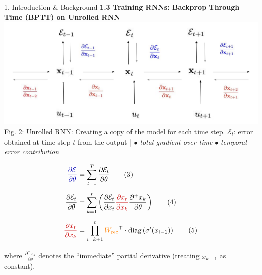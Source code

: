 \documentclass[final]{beamer}
\begin{document}
\begin{frame}[t]
\begin{columns}[t,totalwidth=\textwidth]
\begin{column}{0.3\textwidth}
\begin{block}{1. Introduction \& Background}
        \textbf{1.3 Training RNNs: Backprop Through Time (BPTT) on Unrolled RNN}\\
        \includegraphics[width=0.95\linewidth]{figures/RNN.png} \\[0.3em]
         Fig. 2: Unrolled RNN: Creating a copy of the model for each time step. \textcolor{myblue}{$\mathcal{E}_t$:}  error obtained at time step $t$ from the output |
          $\bullet$ \textcolor{myblue}{ \textit{total gradient over time}}
        \quad
        $\bullet$ \textcolor{myred}{ \textit{temporal error contribution}}


        \vspace{-0.6em}
        \begin{align*}
          \textcolor{myblue}{\frac{\partial \mathcal{E}}{\partial \theta}} &=
          \sum_{t=1}^{T} \frac{\partial \mathcal{E}_t}{\partial \theta} \hspace{2em} \text{(3)} \\[0.5em]
          \frac{\partial \mathcal{E}_t}{\partial \theta} &=
          \sum_{k=1}^{t} 
          \left( {\frac{\partial \mathcal{E}_t}{\partial x_t}} 
          \textcolor{myred}{\frac{\partial x_t}{\partial x_k}}
          \frac{\partial^+ x_k}{\partial \theta} \right) \hspace{2em} \text{(4)} \\[0.5em]
          \textcolor{myred}{\frac{\partial x_t}{\partial x_k}} &=
          \prod_{i=k+1}^{t}
          \textcolor{orange}{W_{\text{rec}}}^\top \cdot \text{diag}\left(\sigma'(x_{i-1})\right) \hspace{2em} \text{(5)}
        \end{align*}
        
        where $\frac{\partial^+ x_k}{\partial \theta}$ denotes the “immediate” partial derivative (treating $x_{k-1}$ as constant).


\end{block}
\end{column}
\end{columns}
\end{frame}
\end{document}

